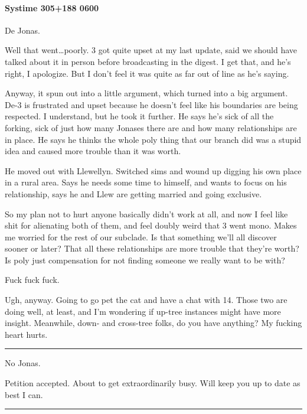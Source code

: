 \hypertarget{systime-305188-0600}{%
\paragraph{Systime 305+188 0600}\label{systime-305188-0600}}

De Jonas.

Well that went\ldots{}poorly. 3 got quite upset at my last update, said we should have talked about it in person before broadcasting in the digest. I get that, and he's right, I apologize. But I don't feel it was quite as far out of line as he's saying.

Anyway, it spun out into a little argument, which turned into a big argument. De-3 is frustrated and upset because he doesn't feel like his boundaries are being respected. I understand, but he took it further. He says he's sick of all the forking, sick of just how many Jonases there are and how many relationships are in place. He says he thinks the whole poly thing that our branch did was a stupid idea and caused more trouble than it was worth.

He moved out with Llewellyn. Switched sims and wound up digging his own place in a rural area. Says he needs some time to himself, and wants to focus on his relationship, says he and Llew are getting married and going exclusive.

So my plan not to hurt anyone basically didn't work at all, and now I feel like shit for alienating both of them, and feel doubly weird that 3 went mono. Makes me worried for the rest of our subclade. Is that something we'll all discover sooner or later? That all these relationships are more trouble that they're worth? Is poly just compensation for not finding someone we really want to be with?

Fuck fuck fuck.

Ugh, anyway. Going to go pet the cat and have a chat with 14. Those two are doing well, at least, and I'm wondering if up-tree instances might have more insight. Meanwhile, down- and cross-tree folks, do you have anything? My fucking heart hurts.

\begin{center}\rule{0.5\linewidth}{\linethickness}\end{center}

No Jonas.

Petition accepted. About to get extraordinarily busy. Will keep you up to date as best I can.

\begin{center}\rule{0.5\linewidth}{\linethickness}\end{center}

